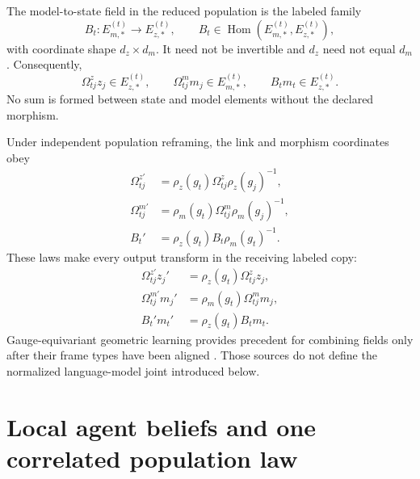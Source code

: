 The model-to-state field in the reduced population is the labeled family
\begin{equation}
B_t:E_{m,\ast}^{(t)}\longrightarrow E_{z,\ast}^{(t)},
\qquad
B_t\in\operatorname{Hom}(E_{m,\ast}^{(t)},E_{z,\ast}^{(t)}),
\label{eq:typed-model-state-morphism}
\end{equation}
with coordinate shape \(d_z\times d_m\). It need not be invertible and \(d_z\) need not equal \(d_m\). Consequently,
\begin{equation}
\Omega^z_{tj}z_j\in E_{z,\ast}^{(t)},
\qquad
\Omega^m_{tj}m_j\in E_{m,\ast}^{(t)},
\qquad
B_tm_t\in E_{z,\ast}^{(t)}.
\label{eq:typed-transported-arguments}
\end{equation}
No sum is formed between state and model elements without the declared morphism.

Under independent population reframing, the link and morphism coordinates obey
\begin{equation}
\begin{aligned}
\Omega_{tj}^{z\prime}
&=\rho_z(g_t)\Omega_{tj}^{z}\rho_z(g_j)^{-1},\\
\Omega_{tj}^{m\prime}
&=\rho_m(g_t)\Omega_{tj}^{m}\rho_m(g_j)^{-1},\\
B_t'&=\rho_z(g_t)B_t\rho_m(g_t)^{-1}.
\end{aligned}
\label{eq:link-morphism-gauge-laws}
\end{equation}
These laws make every output transform in the receiving labeled copy:
\begin{equation}
\begin{aligned}
\Omega_{tj}^{z\prime}z_j'&=\rho_z(g_t)\Omega^z_{tj}z_j,\\
\Omega_{tj}^{m\prime}m_j'&=\rho_m(g_t)\Omega^m_{tj}m_j,\\
B_t'm_t'&=\rho_z(g_t)B_tm_t.
\end{aligned}
\label{eq:transported-argument-equivariance}
\end{equation}
Gauge-equivariant geometric learning provides precedent for combining fields only after their frame types have been aligned \citep{cohen2019gauge,weiler2021coordinate}. Those sources do not define the normalized language-model joint introduced below.

\section{Local agent beliefs and one correlated population law}

